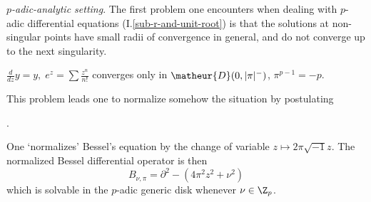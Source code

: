 \begin{para}\label{para::3.1.4}  {\it $p$-adic-analytic setting}.  The first
 problem one encounters when dealing with $p$-adic differential
 equations (\cf I.\ref{sub-r-and-unit-root}) is that the solutions at
 non-singular points have small radii of convergence in general, and do
 not converge up to the next singularity.
 
 \medskip
 $\frac{d}{dz}y=y,\;  e^z=\sum \frac{z^n}{n!} $ converges only in
 $\matheur{D}(0,|\pi|^-)$, $\pi^{p-1}=-p$. 

 \medskip
 This problem leads one to normalize somehow the situation by postulating 

 \medskip{}.

 \medskip
  One `normalizes' Bessel's equation by the
 change of variable $ z\mapsto 2\pi\sqrt{-1} z$. The normalized 
 Bessel differential operator is then   
 \begin{equation*}
  B_{\nu,\pi} = \partial^2  - (4\pi^2 z^2 +\nu^2)  
 \end{equation*}
 which is solvable in the $p$-adic generic disk whenever $\nu \in \Z_p$.
\end{para}

